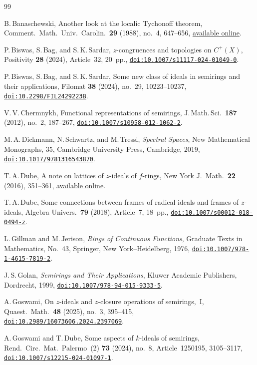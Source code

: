 \documentclass[11pt,leqno]{amsart}
\theoremstyle{plain}
\theoremstyle{definition}
\theoremstyle{remark}
\numberwithin{equation}{section}
\newcommand{\doi}[1]{\href{https://doi.org/#1}{\nolinkurl{doi:#1}}}
\begin{document}
\begin{thebibliography}{99}

B.\,Banaschewski,
Another look at the localic Tychonoff theorem,
Comment.\ Math.\ Univ.\ Carolin.\ \textbf{29} (1988), no.~4,
647--656,
\href{https://dml.cz/dmlcz/106680}{available online}.

P.\,Biswas, S.\,Bag, and S.\,K.\,Sardar,
$z$-congruences and topologies on $C^+(X)$,
Positivity \textbf{28} (2024), Article~32, 20~pp.,
\doi{10.1007/s11117-024-01049-0}.

P.\,Biswas, S.\,Bag, and S.\,K.\,Sardar,
Some new class of ideals in semirings and their applications,
Filomat \textbf{38} (2024), no.~29, 10223--10237,
\doi{10.2298/FIL2429223B}.

V.\,V.\,Chermnykh,
Functional representations of semirings,
J.\,Math.\,Sci.\ \textbf{187} (2012), no.~2, 187--267,
\doi{10.1007/s10958-012-1062-2}.

M.\,A.\,Dickmann, N.\,Schwartz, and M.\,Tressl,
\emph{Spectral Spaces},
New Mathematical Monographs, 35,
Cambridge University Press, Cambridge, 2019,
\doi{10.1017/9781316543870}.

T.\,A.\,Dube,
A note on lattices of $z$-ideals of $f$-rings,
New York J.\ Math.\ \textbf{22} (2016), 351--361,
\href{https://nyjm.albany.edu/j/2016/22-16v.pdf}{available online}.

T.\,A.\,Dube,
Some connections between frames of radical ideals and frames
of $z$-ideals,
Algebra Univers.\ \textbf{79} (2018), Article~7, 18~pp.,
\doi{10.1007/s00012-018-0494-z}.

L.\,Gillman and M.\,Jerison,
\emph{Rings of Continuous Functions},
Graduate Texts in Mathematics, No.~43,
Springer, New York--Heidelberg, 1976,
\doi{10.1007/978-1-4615-7819-2}.

J.\,S.\,Golan,
\emph{Semirings and Their Applications},
Kluwer Academic Publishers, Dordrecht, 1999,
\doi{10.1007/978-94-015-9333-5}.

A.\,Goswami,
On $z$-ideals and $z$-closure operations of semirings,~I,
Quaest.\ Math.\ \textbf{48} (2025), no.~3, 395--415,
\doi{10.2989/16073606.2024.2397069}.

A.\,Goswami and T.\,Dube,
Some aspects of $k$-ideals of semirings,
Rend.\ Circ.\ Mat.\ Palermo~(2) \textbf{73} (2024), no.~8,
Article~1250195, 3105--3117,
\doi{10.1007/s12215-024-01097-1}.


\end{thebibliography}
\end{document}
